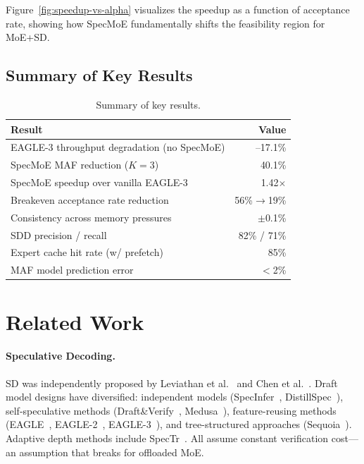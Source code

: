 \documentclass[letterpaper,twocolumn,10pt]{article}
\newcommand{\sysname}{SpecMoE\xspace}
\newcommand{\sdd}{SDD\xspace}
\newcommand{\maf}{MAF\xspace}
\begin{document}
Figure~\ref{fig:speedup-vs-alpha} visualizes the speedup as a function of
acceptance rate, showing how \sysname fundamentally shifts the
feasibility region for MoE+SD.

\subsection{Summary of Key Results}

\begin{table}[t]
\centering
\small
\caption{Summary of key results.}\label{tab:summary}
\begin{tabular}{lr}
\toprule
\textbf{Result} & \textbf{Value} \\
\midrule
EAGLE-3 throughput degradation (no \sysname) & --17.1\% \\
\sysname \maf reduction ($K\!=\!3$) & 40.1\% \\
\sysname speedup over vanilla EAGLE-3 & 1.42$\times$ \\
Breakeven acceptance rate reduction & 56\%$\to$19\% \\
Consistency across memory pressures & $\pm$0.1\% \\
\sdd precision / recall & 82\% / 71\% \\
Expert cache hit rate (w/ prefetch) & 85\% \\
MAF model prediction error & $<$2\% \\
\bottomrule
\end{tabular}
\end{table}

\section{Related Work}\label{sec:related}

\paragraph{Speculative Decoding.}
SD was independently proposed by Leviathan et al.~\cite{leviathan2023fast}
and Chen et al.~\cite{chen2023accelerating}.  Draft model designs have
diversified: independent models (SpecInfer~\cite{miao2024specinfer},
DistillSpec~\cite{zhou2024distillspec}), self-speculative methods
(Draft\&Verify~\cite{zhang2024draft}, Medusa~\cite{cai2024medusa}),
feature-reusing methods (EAGLE~\cite{li2024eagle},
EAGLE-2~\cite{li2024eagle2}, EAGLE-3~\cite{li2025eagle3}), and
tree-structured approaches (Sequoia~\cite{chen2024sequoia}).  Adaptive
depth methods include SpecTr~\cite{sun2023spectr}.  All assume constant
verification cost---an assumption that breaks for offloaded MoE.
\end{document}
